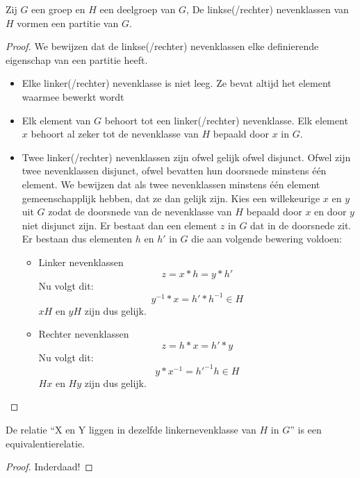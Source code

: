 \documentclass[main.tex]{subfiles}
\begin{document}
\begin{st}
  \label{st:nevenklassen-partitie}
  Zij $G$ een groep en $H$ een deelgroep van $G$, De linkse(/rechter) nevenklassen van $H$ vormen een partitie van $G$.

  \begin{proof}
    We bewijzen dat de linkse(/rechter) nevenklassen elke definierende eigenschap van een partitie heeft.
    \begin{itemize}
    \item Elke linker(/rechter) nevenklasse is niet leeg. Ze bevat altijd het element waarmee bewerkt wordt
    \item Elk element van $G$ behoort tot een linker(/rechter) nevenklasse.
      Elk element $x$ behoort al zeker tot de nevenklasse van $H$ bepaald door $x$ in $G$.
    \item Twee linker(/rechter) nevenklassen zijn ofwel gelijk ofwel disjunct.
      Ofwel zijn twee nevenklassen disjunct, ofwel bevatten hun doorsnede minstens \'e\'en element.
      We bewijzen dat als twee nevenklassen minstens \'e\'en element gemeenschapplijk hebben, dat ze dan gelijk zijn.
      Kies een willekeurige $x$ en $y$ uit $G$ zodat de doorsnede van de nevenklasse van $H$ bepaald door $x$ en door $y$ niet disjunct zijn.
      Er bestaat dan een element $z$ in $G$ dat in de doorsnede zit.
      Er bestaan dus elementen $h$ en $h'$ in $G$ die aan volgende bewering voldoen:
      \begin{itemize}
      \item Linker nevenklassen
        \[ z = x*h = y*h' \]
        Nu volgt dit:
        \[ y^{-1}*x = h'*h^{-1} \in H \]
        $xH$ en $yH$ zijn dus gelijk.
      \item Rechter nevenklassen
        \[ z = h*x = h'*y \]
        Nu volgt dit:
        \[ y*x^{-1} = h'^{-1}h \in H \]
        $Hx$ en $Hy$ zijn dus gelijk.
      \end{itemize}
    \end{itemize}
  \end{proof}
\end{st}

\begin{gev}
  De relatie ``X en Y liggen in dezelfde linkernevenklasse van $H$ in $G$'' is een equivalentierelatie.
  \begin{proof}
    Inderdaad!
  \end{proof}
\end{gev}
\end{document}
